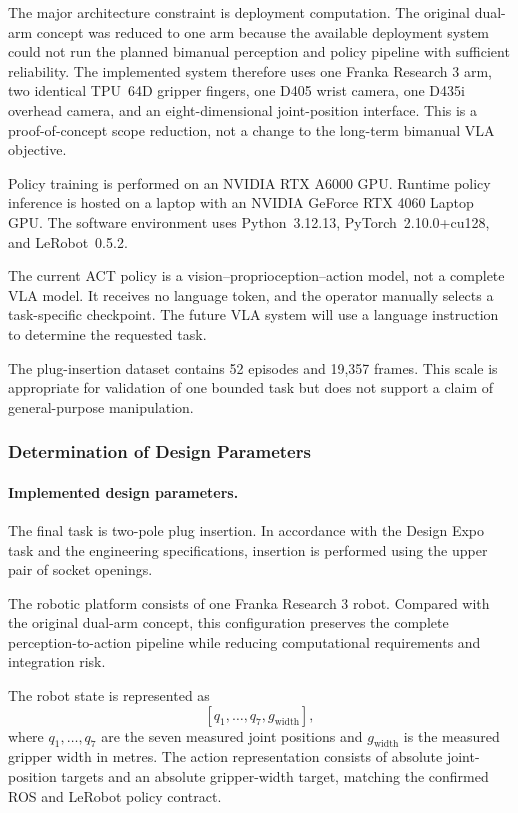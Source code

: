 \documentclass[12pt, letterpaper]{article}
\begin{document}
The major architecture constraint is deployment computation. The original dual-arm concept was reduced to one arm because the available deployment system could not run the planned bimanual perception and policy pipeline with sufficient reliability. The implemented system therefore uses one Franka Research 3 arm, two identical TPU~64D gripper fingers, one D405 wrist camera, one D435i overhead camera, and an eight-dimensional joint-position interface. This is a proof-of-concept scope reduction, not a change to the long-term bimanual VLA objective.

Policy training is performed on an NVIDIA RTX A6000 GPU. Runtime policy inference is hosted on a laptop with an NVIDIA GeForce RTX 4060 Laptop GPU. The software environment uses Python~3.12.13, PyTorch~2.10.0+cu128, and LeRobot~0.5.2.

The current ACT policy is a vision--proprioception--action model, not a complete VLA model. It receives no language token, and the operator manually selects a task-specific checkpoint. The future VLA system will use a language instruction to determine the requested task.

The plug-insertion dataset contains 52 episodes and 19,357 frames. This scale is appropriate for validation of one bounded task but does not support a claim of general-purpose manipulation.

\subsubsection{Determination of Design Parameters}

\paragraph{Implemented design parameters.}
The final task is two-pole plug insertion. In accordance with the Design Expo task and the engineering specifications, insertion is performed using the upper pair of socket openings.

The robotic platform consists of one Franka Research 3 robot. Compared with the original dual-arm concept, this configuration preserves the complete perception-to-action pipeline while reducing computational requirements and integration risk.

The robot state is represented as
\[
[q_1,\ldots,q_7,g_{\mathrm{width}}],
\]
where \(q_1,\ldots,q_7\) are the seven measured joint positions and \(g_{\mathrm{width}}\) is the measured gripper width in metres. The action representation consists of absolute joint-position targets and an absolute gripper-width target, matching the confirmed ROS and LeRobot policy contract.
\end{document}
